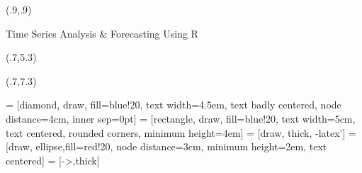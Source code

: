 \usepackage{bm,booktabs,animate,ragged2e,multicol,microtype,hyperref}

\graphicspath{{figs/}}
\def\full#1{\vspace*{0.15cm}\centerline{\texttt{[image: \#1]}}}

\fontsize{12}{14}\sf
\usepackage[scale=0.85]{sourcecodepro}
\usepackage{fontawesome}

{

\begin{textblock}{10.5}(.9,.9)\fontsize{20}{22}\sf
{\color[RGB]{0, 0, 0}\raggedright{}\par Time Series Analysis \& Forecasting Using R}
\end{textblock}

\begin{textblock}{7.5}(.7,5.3)
{\fontsize{15}{15}\sf\color[RGB]{255, 255, 255}\raggedright{\inserttitle}}
\end{textblock}
\begin{textblock}{7.5}(.7,7.3)
{\fontsize{15}{15}\sf\color[RGB]{255, 255, 255}\raggedright{\insertauthor}}
\end{textblock}
}


\def\E{\text{E}}
\def\V{\text{Var}}
\def\up#1{\raisebox{-0.3cm}{#1}}
\def\pred#1#2#3{\hat{#1}_{#2|#3}}
\def\damped{$_\text{d}$}
\def\h+{h_{m}^{+}}
\def\st#1{\rlap{#1}\textcolor{red}{\rule{1cm}{0.1cm}}}

\def\fullwidth#1{\vspace*{-0.0cm}\par\centerline{\texttt{[image: \#1]}}}
\def\fullheight#1{\vspace*{0.02cm}\par\centerline{\texttt{[image: \#1]}}}


\usepackage{tikz}

\usetikzlibrary{trees,shapes,arrows,matrix}
 = [diamond, draw, fill=blue!20,
    text width=4.5em, text badly centered, node distance=4cm, inner sep=0pt]
 = [rectangle, draw, fill=blue!20,
    text width=5cm, text centered, rounded corners, minimum height=4em]
 = [draw, thick, -latex']
 = [draw, ellipse,fill=red!20, node distance=3cm,
    minimum height=2em, text centered]
 = [->,thick]


\usepackage{longtable,caption,setspace}
